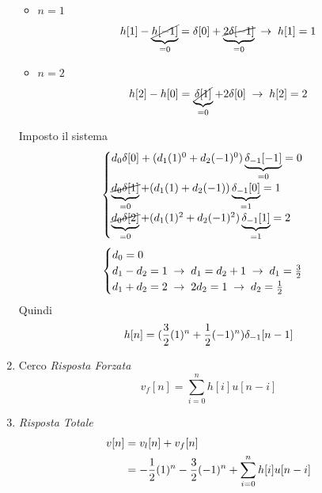 \documentclass{article}
\begin{document}
\begin{enumerate}
\begin{itemize}
\[							  \]
						\item \textbf{$ n=1 $}
							  \[
							  	h[1] - \underbrace{\cancel{h[-1]}}_{=0} = \delta[0] + \underbrace{\cancel{2\delta[-1]}}_{=0}\; \rightarrow\; h[1] = 1
							  \]
						\item \textbf{$ n=2 $}
							  \[
							  	h[2] - h[0] = \underbrace{\cancel{\delta[1]}}_{=0} + 2\delta[0]\; \rightarrow\; h[2] = 2
							  \]
					  \end{itemize}
					  Imposto il sistema
					  \[
					  	\begin{cases}
					  		d_0\delta[0] + (d_1(1)^0 + d_2(-1)^0)\underbrace{\delta_{-1}[-1]}_{=0} = 0 \\
							\underbrace{\cancel{d_0\delta[1]}}_{=0} + (d_1(1) + d_2(-1))\underbrace{\delta_{-1}[0]}_{=1} = 1 \\
							\underbrace{\cancel{d_0\delta[2]}}_{=0} + (d_1(1)^2 + d_2(-1)^2)\underbrace{\delta_{-1}[1]}_{=1} = 2
					  	\end{cases}
					  \]
					  \[
					  	\begin{cases}
					  		d_0 = 0 \\
							d_1 - d_2 = 1\; \rightarrow\; d_1 = d_2 + 1\; \rightarrow\; d_1 = {{3}\over{2}} \\
							d_1 + d_2 = 2\; \rightarrow\; 2d_2 = 1\; \rightarrow\; d_2 = {{1}\over{2}}
					  	\end{cases}
					  \]
					  Quindi
					  \[
					  	h[n] = ({{3}\over{2}}(1)^n + {{1}\over{2}}(-1)^n)\delta_{-1}[n - 1]
					  \]
				\item Cerco \textit{Risposta Forzata}
					  \[
					  	v_f[n] = \sum_{i=0}^{n} {h[i]u[n - i]}
					  \]
				\item \textit{Risposta Totale}
					  \[
					  	\begin{aligned}
							v[n] &= v_l[n] + v_f[n] \\
							&= -{{1}\over{2}}(1)^n - {{3}\over{2}}(-1)^n + \sum_{i=0}^{n} {h[i]u[n - i]}
					  	\end{aligned}
					  \]
			\end{enumerate}

		\newpage
\end{document}
